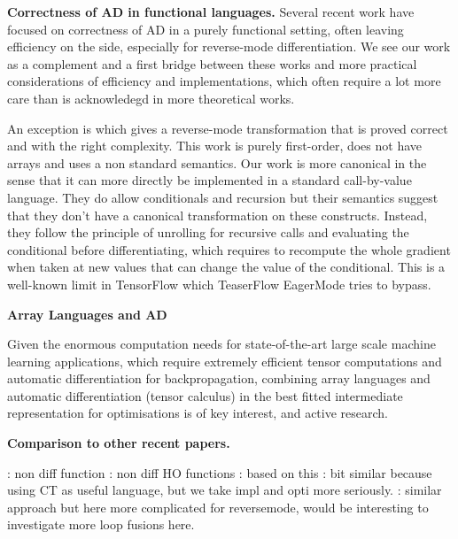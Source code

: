 \noindent \textbf{Correctness of AD in functional languages.}
Several recent work \cite{huot2020correctness,vakar2020reverse,vakar2020denotational,brunel2019backpropagation,barthe2020versatility,mazza2021automatic,ee2020correctness} have focused on correctness of AD in a purely functional setting, 
often leaving efficiency on the side, especially for reverse-mode differentiation. 
We see our work as a complement and a first bridge between these works 
and more practical considerations of efficiency and implementations, 
which often require a lot more care than is acknowledegd in more theoretical works.

An exception is \cite{abadi-plotkin2020} which gives a reverse-mode transformation that is proved correct and with the right complexity.
This work is purely first-order, does not have arrays and uses a non standard semantics. 
Our work is more canonical in the sense that it can more directly be implemented in a standard call-by-value language.
They do allow conditionals and recursion but their semantics suggest that they don't have a canonical transformation on these constructs. 
Instead, they follow the principle of unrolling for recursive calls and evaluating the conditional before differentiating, 
which requires to recompute the whole gradient when taken at new values that can change the value of the conditional. 
This is a well-known limit in TensorFlow \cite{abadi2016tensorflow} which TeaserFlow EagerMode \cite{agrawal2019tensorflow} tries to bypass. 

\noindent \textbf{Array Languages and AD}

Given the enormous computation needs for state-of-the-art large scale machine learning applications, 
which require extremely efficient tensor computations and automatic differentiation for backpropagation, 
combining array languages and automatic differentiation (tensor calculus) in the best 
fitted intermediate representation for optimisations is of key interest, and active research.
\cite{bernstein2020differentiating} 
\cite{laue2018computing,laue2020simple}

\noindent \textbf{Comparison to other recent papers.}

\cite{ee2020correctness}: non diff function
\cite{sherman2021}: non diff HO functions
\cite{pearlmutter2008reverse}: based on this
\cite{elliott2018simple}: bit similar because using CT as useful language, but we take impl and opti more seriously.
\cite{shaikhha2019efficient}: similar approach but here more complicated for reversemode, would be interesting to investigate more loop fusions here.

